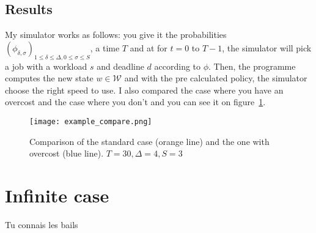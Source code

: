 \documentclass[
10pt, %
a4paper, %
oneside, %
headinclude,footinclude, %
BCOR5mm, %
]{scrartcl}
\newcommand{\W}{\mathcal{W}}
\begin{document}
\subsection{Results}

My simulator works as follows: you give it the probabilities
$(\phi_{\delta,\sigma})_{1\leq\delta\leq \Delta,0\leq\sigma\leq S}$, a
time $T$ and at for $t=0$ to $T-1$, the
simulator will pick a job with a workload $s$ and deadline $d$
according to $\phi$. Then, the programme computes the new state $w\in\W$
and with the pre calculated policy, the simulator choose the right
speed to use. I also compared the case where you have an overcost and
the case where you don't and you can see it on
figure~\ref{fig:algo_overcost}.

\begin{figure}
  \centering
  \texttt{[image: example\_compare.png]}
  \caption{Comparison of the standard case (orange line) and the one
    with overcost (blue line). $T=30,\Delta=4,S=3$}
  \label{fig:algo_overcost}
\end{figure}

\section{Infinite case}
Tu connais les bails
\end{document}
